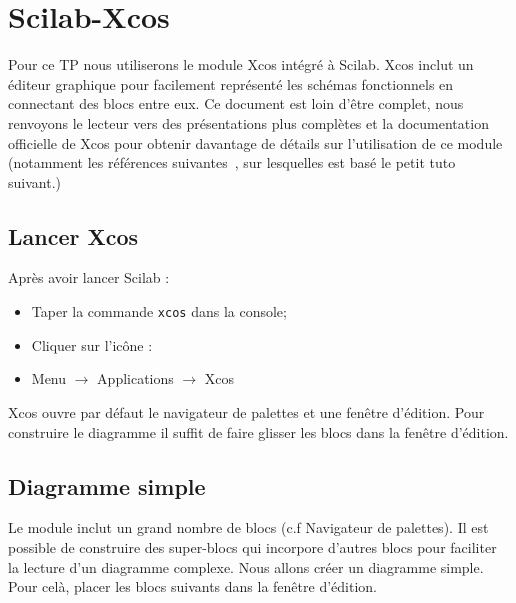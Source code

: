 \section{Scilab-Xcos}
Pour ce TP nous utiliserons le module Xcos intégré à Scilab. Xcos inclut un 
éditeur graphique pour facilement représenté les schémas fonctionnels
en connectant des blocs entre eux. Ce document est loin d'être complet,
nous renvoyons le lecteur vers des présentations plus complètes et la documentation
officielle de Xcos pour obtenir davantage de détails sur l'utilisation de ce module (notamment les références
suivantes~\cite{steer2014scilab,premier,xcos}, sur lesquelles est basé le petit tuto suivant.)

\subsection{Lancer Xcos}
Après avoir lancer Scilab :
\begin{itemize}
    \item Taper la commande \verb?xcos? dans la console;
    \item Cliquer sur l'icône : 
    \item Menu $\rightarrow$ Applications $\rightarrow$ Xcos
\end{itemize}

Xcos ouvre par défaut le navigateur de palettes et une fenêtre d'édition. Pour construire le diagramme
il suffit de faire glisser les blocs dans la fenêtre d'édition.

\subsection{Diagramme simple}

Le module inclut un grand nombre de blocs (c.f Navigateur de palettes).
Il est possible de construire des super-blocs qui incorpore d'autres blocs pour faciliter la lecture d'un
diagramme complexe. \newline
Nous allons créer un diagramme simple. Pour celà, placer les blocs suivants dans la fenêtre d'édition.

